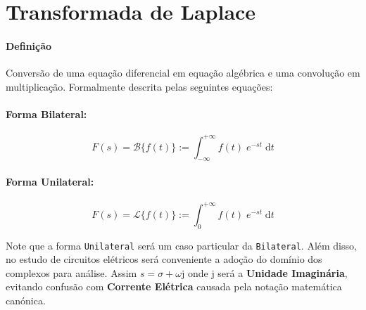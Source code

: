 \documentclass{article}
\begin{document}
\section{Transformada de Laplace}
    \paragraph{Definição}Conversão de uma equação diferencial em equação algébrica e uma convolução em multiplicação. Formalmente descrita pelas seguintes equações:
    \begin{multicols}{2}
        \raggedcolumns
        \paragraph{Forma Bilateral:}
        \begin{equation}
            \boxed{
                F(s) = \mathcal{B} \{ f(t) \} := \int_{-\infty}^{+\infty} f(t) \; e^{-st} \; \text{d}t
            }
        \end{equation}
        \columnbreak
        \paragraph{Forma Unilateral:}
        \begin{equation}
            \boxed{
                F(s) = \mathcal{L}\{ f(t) \} := \int_{0}^{+\infty} f(t) \; e^{-st} \; \text{d} t
            }
        \end{equation}
    \end{multicols}\noindent
    Note que a forma \texttt{Unilateral} será um caso particular da \texttt{Bilateral}. Além disso, no estudo de circuitos elétricos será conveniente a adoção do domínio dos complexos para análise. Assim $s = \sigma + \omega\text{j}$ onde $\text{j}$ será a \textbf{Unidade Imaginária}, evitando confusão com \textbf{Corrente Elétrica} causada pela notação matemática canónica.
\end{document}

